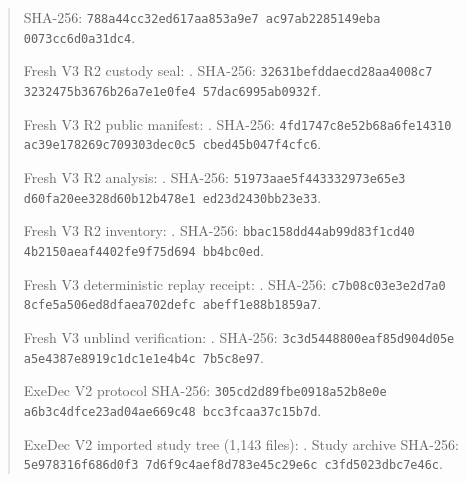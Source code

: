 \documentclass[twoside,11pt]{article}
\begin{document}
\begin{quote}
SHA-256:
\texttt{788a44cc\allowbreak 32ed617a\allowbreak a853a9e7\allowbreak
ac97ab22\allowbreak 85149eba\allowbreak
0073cc6d\allowbreak 0a31dc4}.\par
Fresh V3 R2 custody seal:
.
SHA-256:
\texttt{32631bef\allowbreak ddaecd28\allowbreak aa4008c7\allowbreak
3232475b\allowbreak 3676b26a\allowbreak 7e1e0fe4\allowbreak
57dac699\allowbreak 5ab0932f}.\par
Fresh V3 R2 public manifest:
.
SHA-256:
\texttt{4fd1747c\allowbreak 8e52b68a\allowbreak 6fe14310\allowbreak
ac39e178\allowbreak 269c7093\allowbreak 03dec0c5\allowbreak
cbed45b0\allowbreak 47f4cfc6}.\par
Fresh V3 R2 analysis:
.
SHA-256:
\texttt{51973aae\allowbreak 5f443332\allowbreak 973e65e3\allowbreak
d60fa20e\allowbreak e328d60b\allowbreak 12b478e1\allowbreak
ed23d243\allowbreak 0bb23e33}.\par
Fresh V3 R2 inventory:
.
SHA-256:
\texttt{bbac158d\allowbreak d44ab99d\allowbreak 83f1cd40\allowbreak
4b2150ae\allowbreak af4402fe\allowbreak 9f75d694\allowbreak
bb4bc0ed}.\par
Fresh V3 deterministic replay receipt:
.
SHA-256:
\texttt{c7b08c03\allowbreak e3e2d7a0\allowbreak
8cfe5a50\allowbreak 6ed8dfae\allowbreak a702defc\allowbreak
abeff1e8\allowbreak 8b1859a7}.\par
Fresh V3 unblind verification:
.
SHA-256:
\texttt{3c3d5448\allowbreak 800eaf85\allowbreak d904d05e\allowbreak
a5e4387e\allowbreak 8919c1dc\allowbreak 1e1e4b4c\allowbreak
7b5c8e97}.\par
ExeDec V2 protocol SHA-256:
\texttt{305cd2d8\allowbreak 9fbe0918\allowbreak a52b8e0e\allowbreak
a6b3c4df\allowbreak ce23ad04\allowbreak ae669c48\allowbreak
bcc3fcaa\allowbreak 37c15b7d}.\par
ExeDec V2 imported study tree (1,143 files):
. Study archive
SHA-256:
\texttt{5e978316\allowbreak f686d0f3\allowbreak
7d6f9c4a\allowbreak ef8d783e\allowbreak 45c29e6c\allowbreak
c3fd5023\allowbreak dbc7e46c}.\par

\end{quote}
\end{document}
